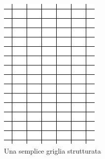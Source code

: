 \documentclass[a4paper,10pt]{report}
\theoremstyle{plain}
\theoremstyle{definition}
\theoremstyle{remark}
\begin{document}
\begin{figure}[p]
 \centering
 \begin{subfigure}[t]{.48\linewidth}
 \centering
 \includegraphics[width=.85\linewidth]{img/BaseGrid}
 \caption{Una semplice griglia strutturata}
 \label{fig:struct_grid}
 \vspace{4ex}
 \end{subfigure}
 \hfill
  \begin{subfigure}[t]{.48\linewidth}
 \centering

\end{subfigure}
\end{figure}
\end{document}

